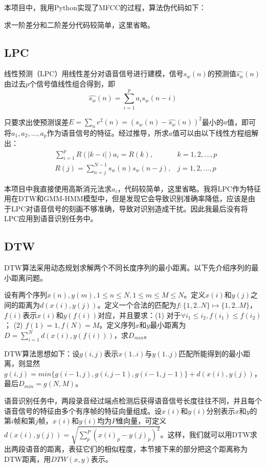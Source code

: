 \documentclass[UTF8]{article}
\begin{document}
本项目中，我用Python实现了MFCC的过程，算法伪代码如下：
~\\

\vspace{10pt}

求一阶差分和二阶差分代码较简单，这里省略。

\subsection{LPC}
线性预测（LPC）用线性差分对语音信号进行建模，信号$s_w(n)$的预测值$\hat{s_w}(n)$由过去$p$个信号值线性组合得到，即
\[
	\hat{s_w}(n)=\sum_{i=1}^p a_i s_w(n-i)
\]

只要求出使预测误差$E=\sum_n e^2(n)=(s_w(n)-\hat{s_w}(n))^2$最小的$a$值，即可将$a_1, a_2, ..., a_p$作为语音信号的特征。经过推导，所求$a$值可以由以下线性方程组解出：
\begin{align*}
	   &\sum_{i=1}^p R(|k-i|)a_i=R(k), &k=1,2, ..., p        \\
	   &R(j)=\sum_{n=j}^{N-1} s_w(n)s_w(n-j), &j=1,2, ..., p 
\end{align*}

本项目中我直接使用高斯消元法求$a_i$，代码较简单，这里省略。我将LPC作为特征用在DTW和GMM-HMM模型中，但是发现它会导致识别准确率降低，应该是由于LPC对语音信号的刻画不够准确，导致对识别造成干扰。因此我最后没有将LPC应用到语音识别任务中。

\subsection{DTW}
DTW算法采用动态规划求解两个不同长度序列的最小距离。以下先介绍序列的最小距离问题。

设有两个序列$x(n),y(m), 1 \le n \le N, 1 \le m \le M \le N$。定义$x(i)$和$y(j)$之间的距离为$d(x(i), y(j))$。定义一个合法的匹配为$f: \{ 1, 2 .. N \} \mapsto \{ 1,2 .. M \} $，$f(i)$表示$x(i)$和$y(f(i))$对应，并且要求：(1) 对于${\forall} i_1 \le i_2, f(i_1) \le f(i_2)$； (2) $f(1)=1, f(N)=M$。定义序列$x$和$y$最小距离为$D=\sum_{i=1}^N d(x(i),y(f(i)))$，求$D_{min}$。

DTW算法思想如下：设$g(i,j)$表示$x(1..i)$与$y(1..j)$匹配所能得到的最小距离，则显然$g(i,j)=min\{g(i-1, j), g(i, j-1), g(i-1, j-1)\}+d(x(i), y(j))$，最后$D_{min}=g(N, M)$。

语音识别任务中，两段录音经过端点检测后获得语音信号长度往往不同，并且每个语音信号的特征由多个有序帧的特征向量组成。设$x(i)$和$y(i)$分别表示$x$和$y$的第$i$帧和第$j$帧，$x(i)$和$y(i)$均为$P$维向量，可定义$d(x(i), y(j))=\sqrt{\sum_{p}^P(x(i)_p-y(j)_p)^2}$。这样，我们就可以用DTW求出两段语音的距离，表征它们的相似程度，本节接下来的部分把这个距离称为DTW距离，用$DTW(x,y)$表示。
\end{document}
